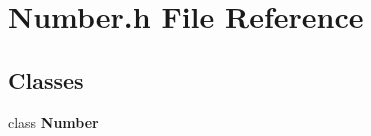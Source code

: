 \section{Number.\+h File Reference}
\label{_number_8h}
\subsection*{Classes}
\begin{DoxyCompactItemize}
\item 
class \textbf{ Number}
\end{DoxyCompactItemize}
